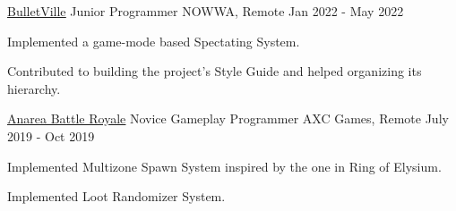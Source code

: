 \begin{cventries}
  \cventry
    {\href{https://wizardcell.com/about/bulletville}{\underline{BulletVille}}} %
    {Junior Programmer} %
    {NOWWA, Remote} %
    {Jan 2022 - May 2022} %
    {
      \begin{cvitems} %
        \item {Implemented a game-mode based Spectating System.}
        \item {Contributed to building the project's Style Guide and helped organizing its hierarchy.}
      \end{cvitems}
    }

  \cventry
    {\href{https://wizardcell.com/about/anarea}{\underline{Anarea Battle Royale}}} %
    {Novice Gameplay Programmer} %
    {AXC Games, Remote} %
    {July 2019 - Oct 2019} %
    {
      \begin{cvitems} %
        \item {Implemented Multizone Spawn System inspired by the one in Ring of Elysium.}
        \item {Implemented Loot Randomizer System.}
      \end{cvitems}
    }

\end{cventries}
